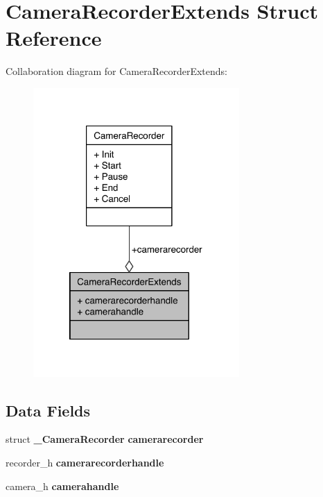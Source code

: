 \section{Camera\-Recorder\-Extends Struct Reference}
\label{structCameraRecorderExtends}


Collaboration diagram for Camera\-Recorder\-Extends\-:\nopagebreak
\begin{figure}[H]
\begin{center}
\leavevmode
\includegraphics[width=223pt]{structCameraRecorderExtends__coll__graph}
\end{center}
\end{figure}
\subsection*{Data Fields}
\begin{DoxyCompactItemize}
\item 
struct {\bf \-\_\-\-Camera\-Recorder} {\bfseries camerarecorder}\label{structCameraRecorderExtends_a345628ad5fbaeb862a916d152a9fdfe3}

\item 
recorder\-\_\-h {\bfseries camerarecorderhandle}\label{structCameraRecorderExtends_a9cb2d9772a936cf1336d903ba1593811}

\item 
camera\-\_\-h {\bfseries camerahandle}\label{structCameraRecorderExtends_a726c50cc1369f844d7453fb10ca31c0f}

\end{DoxyCompactItemize}


